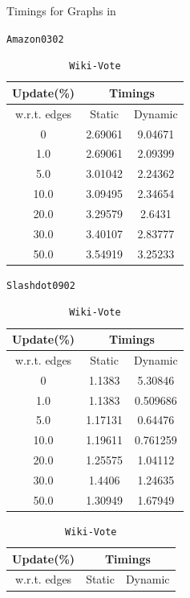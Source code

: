\begin{table}[H]
    \centering
    \caption{Timings for Graphs in \tableref{\ref{tab:graph_details}} }
    \label{tab:ti}
\parbox{0.45\linewidth}{
    \centering
    \caption{\texttt{Amazon0302}}
    \label{tab:Amazon0302}
    \begin{tabular}{|c|c|c|}
        \hline
        \textbf{Update(\%)} & \multicolumn{2}{c|}{\textbf{Timings}} \\
        \hline
        w.r.t. edges & Static &  Dynamic \\
        \hline
        0 & 2.69061 & 9.04671 \\
        1.0 & 2.69061 & 2.09399 \\
        5.0 & 3.01042 & 2.24362 \\
        10.0 & 3.09495 & 2.34654 \\
        20.0 & 3.29579 & 2.6431 \\
        30.0 & 3.40107 & 2.83777 \\
        50.0 & 3.54919 & 3.25233 \\
        \hline
    \end{tabular}
}
\hfill
\parbox{0.45\linewidth}{
    \centering
    \caption{\texttt{Slashdot0902}}
    \label{tab:Slashdot0902}
    \begin{tabular}{|c|c|c|}
        \hline
        \textbf{Update(\%)} & \multicolumn{2}{c|}{\textbf{Timings}} \\
        \hline
        w.r.t. edges & Static &  Dynamic \\
        \hline
        0 & 1.1383 & 5.30846 \\
        1.0 & 1.1383 & 0.509686 \\
        5.0 & 1.17131 & 0.64476 \\
        10.0 & 1.19611 & 0.761259 \\
        20.0 & 1.25575 & 1.04112 \\
        30.0 & 1.4406 & 1.24635 \\
        50.0 & 1.30949 & 1.67949 \\
        \hline
    \end{tabular}
}
\hfill
\parbox{0.45\linewidth}{
    \vspace{1.5em}
    \centering
    \caption{\texttt{Wiki-Vote}}
    \label{tab:Wiki-Vote}
    \begin{tabular}{|c|c|c|}
        \hline
        \textbf{Update(\%)} & \multicolumn{2}{c|}{\textbf{Timings}} \\
        \hline
        w.r.t. edges & Static &  Dynamic \\

\end{tabular}}
\end{table}
